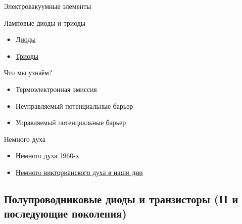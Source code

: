 \documentclass[xetex,aspectratio=43]{beamer}
\begin{document}
\begin{frame}{Электровакуумные элементы}

\begin{block}{Ламповые диоды и триоды }
\begin{itemize}
    \item \href{https://en.wikipedia.org/wiki/Vacuum_tube\#Diodes}{Диоды}
    \item \href{https://en.wikipedia.org/wiki/Vacuum_tube\#Triodes}{Триоды}
\end{itemize}
\end{block}

\begin{block}{Что мы узнаём?}
\begin{itemize}
    \item Термоэлектронная эмиссия
    \item Неуправляемый потенциальные барьер
    \item Управляемый потенциальные барьер
\end{itemize}

\end{block}


\pause

\begin{block}{Немного духа}
\begin{itemize}
    \item \href{https://youtu.be/DEewNHWgqFU}{Немного духа 1960-х}
    \item \href{https://youtu.be/EzyXMEpq4qw}{Немного викторианского духа в наши дни}
\end{itemize}

\end{block}

\end{frame}

\subsection[Полупроводниковые диоды и транзисторы, II+]{Полупроводниковые диоды и транзисторы (II и последующие поколения)}
\end{document}
